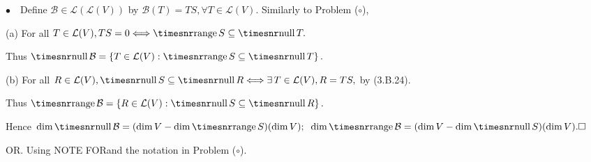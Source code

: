 \documentclass[a4paper, 11pt, UTF8]{article}
\def\range{{\timesnr\textup{range}}\,}
\def\null{{\timesnr\textup{null}}\,}
\def\Lm{\mathcal{L}}
\def\BulletPoint{{\small$\bullet$}}
\def\Ha{\quad\hspace{8pt}}
\def\Hb{\quad\hspace{8.7pt}}
\def\Or{\large O{\footnotesize R.} }
\def\NOTEFOR{{\timesnr\large N{\footnotesize OTE} F{\footnotesize OR}}}
\begin{document}
\begin{large}
\BulletPoint \,\hspace{1pt}\Comment\,\,\, {\Large\vspace{6pt}Define $\mathcal{B}\in\Lm\left(\Lm(V)\right)$ by $\mathcal{B}(T)=TS,\forall T\in\Lm(V).$ Similarly to Problem ($\circ$),}\par\quad
(a) {\Large\vspace{3pt}For all $T\in\Lm(V),TS=0\Longleftrightarrow\range S\subseteq\null T.$}\par\quad\Ha
{\Large\vspace{6pt}Thus $\null\mathcal{B}=\left\{T\in\Lm(V):\range S\subseteq\null T\right\}.$}\par\quad
(b) {\Large\vspace{3pt}For all $R\in\Lm(V),\null S\subseteq\null R\Longleftrightarrow\exists\,T\in\Lm(V),R=TS,$ by (3.B.24).}\par\quad\Hb
{\Large\vspace{6pt}Thus $\range\mathcal{B}=\left\{R\in\Lm(V):\null S\subseteq\null R\right\}.$}\par\quad
Hence $\dim\null\mathcal{B}=(\dim V-\dim\range S)(\dim V);\;\;\dim\range\mathcal{B}=(\dim V-\dim\null S)(\dim V).\hfill\square$\vspace{16pt}\par\quad
\Or Using \NOTEFOR\;[3.60] and the notation in Problem ($\circ$).\par
{\Large{}}\vspace{-70pt}\par\quad

\end{large}
\end{document}
